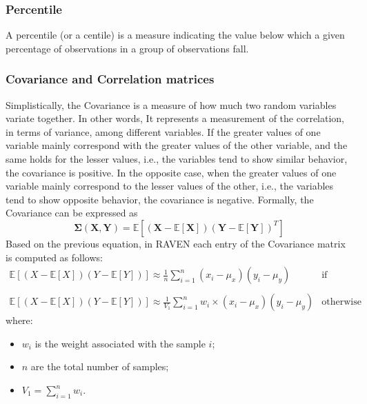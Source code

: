 \subsubsection{Percentile}
A percentile (or a centile) is a measure indicating the value below which a given percentage of observations in a group of observations fall. 

\subsubsection{Covariance and Correlation matrices}
Simplistically, the Covariance is a measure of how much two random variables variate together. In other words, It represents a 
measurement of the correlation, in terms of variance,  among different variables. If the greater values of one variable mainly 
correspond with the greater values of the other variable, and the same holds for the lesser values, i.e., the variables tend to show 
similar behavior, the covariance is positive. In the opposite case, when the greater values of one variable mainly correspond to the 
lesser values of the other, i.e., the variables tend to show opposite behavior, the covariance is negative. 
Formally, the Covariance can be expressed as
\begin{equation}
 \boldsymbol{\Sigma}(\boldsymbol{X},\boldsymbol{Y})  = \mathbb{E} \left [ \left ( \boldsymbol{X}- \mathbb{E}\left [ \boldsymbol{X} \right ] \right ) \left ( \boldsymbol{Y}- \mathbb{E}\left [ \boldsymbol{Y} \right ] \right )^{T}\right ]
\end{equation}
Based on the previous equation, in RAVEN each entry of the Covariance matrix is computed as follows:
\begin{equation}
\begin{matrix}
 \mathbb{E} \left [ \left ( X- \mathbb{E}\left [ X \right ] \right ) \left ( Y- \mathbb{E}\left [ Y \right ] \right )\right ] \approx
 \frac{1}{n}\sum_{i=1}^{n} (x_{i} - \mu_{x})(y_{i} -  \mu_{y})  & \text{if random sampling}  
\\
\\
 \mathbb{E} \left [ \left ( X- \mathbb{E}\left [ X \right ] \right ) \left ( Y- \mathbb{E}\left [ Y \right ] \right )\right ] \approx
\frac{1}{V_{1}} \sum_{i=1}^{n} w_{i} \times (x_{i} -  \mu_{x})(y_{i} -  \mu_{y}) &   \text{otherwise}
\end{matrix}
\end{equation}
where:
\begin{itemize}
  \item $w_{i}$ is the weight associated with the sample $i$;
  \item $n$ are the total number of samples;
  \item $V_{1} = \sum_{i=1}^{n} w_{i}$.
\end{itemize}
